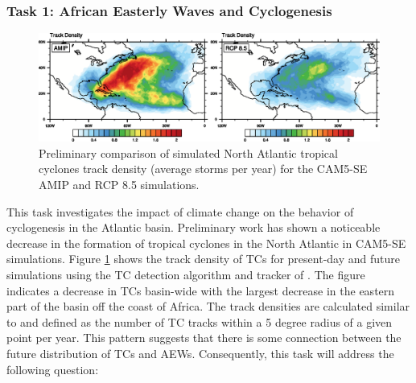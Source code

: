\documentclass[11pt]{article}
\begin{document}

\subsubsection{Task 1: African Easterly Waves and Cyclogenesis} 

\begin{figure}[h]
\begin{center}
\includegraphics[width=6.in]{NA_track_density.eps}
\end{center}
\caption{Preliminary comparison of simulated North Atlantic tropical cyclones track density (average storms per year) for the CAM5-SE AMIP and RCP 8.5 simulations.} \label{fig:NA_density}
\end{figure}

This task investigates the impact of climate change on the behavior of cyclogenesis in the Atlantic basin.  Preliminary work has shown a noticeable decrease in the formation of tropical cyclones in the North Atlantic in CAM5-SE simulations.  Figure \ref{fig:NA_density} shows the track density of TCs for present-day and future simulations using the TC detection algorithm and tracker of \citet{Zhao2009}. The figure indicates a decrease in TCs basin-wide with the largest decrease in the eastern part of the basin off the coast of Africa. The track densities are calculated similar to \citet{Done2013} and defined as the number of TC tracks within a 5 degree radius of a given point per year. This pattern suggests that there is some connection between the future distribution of TCs and AEWs.  Consequently, this task will address the following question:
\end{document}
